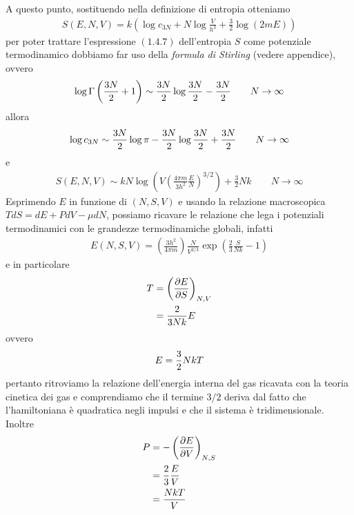 \documentclass{article}
\begin{document}
A questo punto, sostituendo nella definizione di entropia otteniamo
\begin{gather}
    S(E, N, V) = k\left(\log c_{3N} + N\log \frac{V}{h^3} + \frac{3}{2}\log (2mE)\right) \tag{1.4.7}
\end{gather}
per poter trattare l'espressione $(1.4.7)$ dell'entropia $S$ come potenziale termodinamico dobbiamo far uso della \textit{formula di Stirling} (vedere appendice), ovvero
\begin{gather}
    \log\Gamma\left(\frac{3N}{2} + 1\right) \sim \frac{3N}{2}\log\frac{3N}{2} - \frac{3N}{2} \qquad N \rightarrow \infty \notag
\end{gather}
allora
\begin{gather}
    \log c_{3N} \sim \frac{3N}{2}\log\pi - \frac{3N}{2}\log\frac{3N}{2} + \frac{3N}{2} \qquad N \rightarrow \infty \notag
\end{gather}
e
\begin{gather}
    S(E, N, V) \sim kN\log\left(V\left(\frac{4\pi m}{3h^2}\frac{E}{N}\right)^{3/2}\right) + \frac{3}{2}Nk \qquad N \rightarrow \infty \tag{1.4.8} 
\end{gather}
Esprimendo $E$ in funzione di $(N, S, V)$ e usando la relazione macroscopica $TdS = dE + PdV - \mu dN$, possiamo ricavare le relazione che lega i potenziali termodinamici con le grandezze termodinamiche globali, infatti
\begin{gather}
    E(N, S, V) = \left(\frac{3h^2}{4\pi m}\right)\frac{N}{V^{2/3}}\exp\left(\frac{2}{3}\frac{S}{Nk} - 1\right) \tag{1.4.9}
\end{gather}
e in particolare
\begin{align}
    T &= \left(\frac{\partial E}{\partial S}\right)_{N, V} \notag \\
    &= \frac{2}{3Nk}E \notag
\end{align}
ovvero
\begin{gather}
    E = \frac{3}{2}NkT \notag
\end{gather}
pertanto ritroviamo la relazione dell'energia interna del gas ricavata con la teoria cinetica dei gas e comprendiamo che il termine $3/2$ deriva dal fatto che l'hamiltoniana è quadratica negli impulsi e che il sistema è tridimensionale. Inoltre
\begin{align}
    P &= -\left(\frac{\partial E}{\partial V}\right)_{N, S} \notag \\
    &= \frac{2}{3}\frac{E}{V} \notag \\
    &= \frac{NkT}{V} \notag
\end{align}
\end{document}
